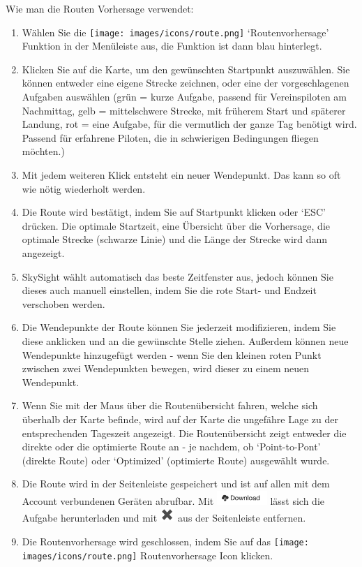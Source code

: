 \documentclass[11pt,a4paper]{article}
\begin{document}
Wie man die Routen Vorhersage verwendet:
\begin{enumerate}
\item Wählen Sie die \texttt{[image: images/icons/route.png]} `Routenvorhersage' Funktion in der Menüleiste aus, die Funktion ist dann blau hinterlegt.
\item Klicken Sie auf die Karte, um den gewünschten Startpunkt auszuwählen. Sie können entweder eine eigene Strecke zeichnen, oder eine der vorgeschlagenen Aufgaben auswählen (grün = kurze Aufgabe, passend für Vereinspiloten am Nachmittag, gelb = mittelschwere Strecke, mit früherem Start und späterer Landung, rot = eine Aufgabe, für die vermutlich der ganze Tag benötigt wird. Passend für erfahrene Piloten, die in schwierigen Bedingungen fliegen möchten.) 
\item Mit jedem weiteren Klick entsteht ein neuer Wendepunkt. Das kann so oft wie nötig wiederholt werden. 
\item Die Route wird bestätigt, indem Sie auf Startpunkt klicken oder `ESC' drücken. Die optimale Startzeit, eine Übersicht über die Vorhersage, die optimale Strecke (schwarze Linie) und die Länge der Strecke wird dann angezeigt.
\item SkySight wählt automatisch das beste Zeitfenster aus, jedoch können Sie dieses auch manuell einstellen, indem Sie die rote Start- und Endzeit verschoben werden. 
\item Die Wendepunkte der Route können Sie jederzeit modifizieren, indem Sie diese anklicken und an die gewünschte Stelle ziehen. Außerdem können neue Wendepunkte hinzugefügt werden - wenn Sie den kleinen roten Punkt zwischen zwei Wendepunkten bewegen, wird dieser zu einem neuen Wendepunkt. 
\item Wenn Sie mit der Maus über die Routenübersicht fahren, welche sich überhalb der Karte befinde, wird auf der Karte die ungefähre Lage zu der entsprechenden Tageszeit angezeigt. Die Routenübersicht zeigt entweder die direkte oder die optimierte Route an - je nachdem, ob `Point-to-Pont' (direkte Route) oder `Optimized' (optimierte Route) ausgewählt wurde. 
\item Die Route wird in der Seitenleiste gespeichert und ist auf allen mit dem Account verbundenen Geräten abrufbar. Mit \includegraphics[height=15pt]{images/icons/download.png} lässt sich die Aufgabe herunterladen und mit \includegraphics[height=15pt]{images/icons/x.png} aus der Seitenleiste entfernen. 
\item Die Routenvorhersage wird geschlossen, indem Sie auf das \texttt{[image: images/icons/route.png]} Routenvorhersage Icon klicken.
\end{enumerate}
\end{document}
